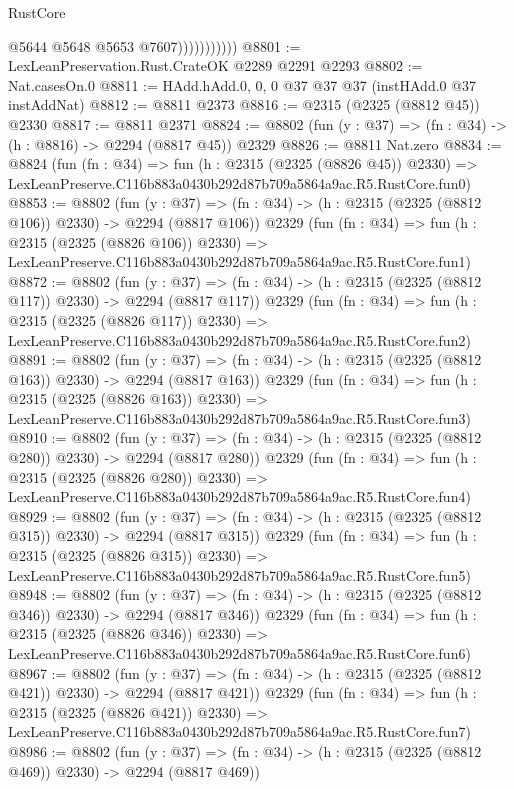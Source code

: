 \begin{lexlean}{RustCore}
\begin{coremodule}
                          @5644
                          @5648
                          @5653
                          @7607)))))))))))
@8801 := LexLeanPreservation.Rust.CrateOK @2289 @2291 @2293
@8802 := Nat.casesOn.{0}
@8811 := HAdd.hAdd.{0, 0, 0} @37 @37 @37 (instHAdd.{0} @37 instAddNat)
@8812 := @8811 @2373
@8816 := @2315 (@2325 (@8812 @45)) @2330
@8817 := @8811 @2371
@8824 := @8802 (fun (y : @37) => (fn : @34) -> (h : @8816) -> @2294 (@8817 @45)) @2329
@8826 := @8811 Nat.zero
@8834 := @8824
    (fun (fn : @34) =>
    fun (h : @2315 (@2325 (@8826 @45)) @2330) =>
    LexLeanPreserve.C116b883a0430b292d87b709a5864a9ac.R5.RustCore.fun0)
@8853 := @8802
    (fun (y : @37) => (fn : @34) -> (h : @2315 (@2325 (@8812 @106)) @2330) -> @2294 (@8817 @106))
    @2329
    (fun (fn : @34) =>
    fun (h : @2315 (@2325 (@8826 @106)) @2330) =>
    LexLeanPreserve.C116b883a0430b292d87b709a5864a9ac.R5.RustCore.fun1)
@8872 := @8802
    (fun (y : @37) => (fn : @34) -> (h : @2315 (@2325 (@8812 @117)) @2330) -> @2294 (@8817 @117))
    @2329
    (fun (fn : @34) =>
    fun (h : @2315 (@2325 (@8826 @117)) @2330) =>
    LexLeanPreserve.C116b883a0430b292d87b709a5864a9ac.R5.RustCore.fun2)
@8891 := @8802
    (fun (y : @37) => (fn : @34) -> (h : @2315 (@2325 (@8812 @163)) @2330) -> @2294 (@8817 @163))
    @2329
    (fun (fn : @34) =>
    fun (h : @2315 (@2325 (@8826 @163)) @2330) =>
    LexLeanPreserve.C116b883a0430b292d87b709a5864a9ac.R5.RustCore.fun3)
@8910 := @8802
    (fun (y : @37) => (fn : @34) -> (h : @2315 (@2325 (@8812 @280)) @2330) -> @2294 (@8817 @280))
    @2329
    (fun (fn : @34) =>
    fun (h : @2315 (@2325 (@8826 @280)) @2330) =>
    LexLeanPreserve.C116b883a0430b292d87b709a5864a9ac.R5.RustCore.fun4)
@8929 := @8802
    (fun (y : @37) => (fn : @34) -> (h : @2315 (@2325 (@8812 @315)) @2330) -> @2294 (@8817 @315))
    @2329
    (fun (fn : @34) =>
    fun (h : @2315 (@2325 (@8826 @315)) @2330) =>
    LexLeanPreserve.C116b883a0430b292d87b709a5864a9ac.R5.RustCore.fun5)
@8948 := @8802
    (fun (y : @37) => (fn : @34) -> (h : @2315 (@2325 (@8812 @346)) @2330) -> @2294 (@8817 @346))
    @2329
    (fun (fn : @34) =>
    fun (h : @2315 (@2325 (@8826 @346)) @2330) =>
    LexLeanPreserve.C116b883a0430b292d87b709a5864a9ac.R5.RustCore.fun6)
@8967 := @8802
    (fun (y : @37) => (fn : @34) -> (h : @2315 (@2325 (@8812 @421)) @2330) -> @2294 (@8817 @421))
    @2329
    (fun (fn : @34) =>
    fun (h : @2315 (@2325 (@8826 @421)) @2330) =>
    LexLeanPreserve.C116b883a0430b292d87b709a5864a9ac.R5.RustCore.fun7)
@8986 := @8802
    (fun (y : @37) => (fn : @34) -> (h : @2315 (@2325 (@8812 @469)) @2330) -> @2294 (@8817 @469))

\end{coremodule}
\end{lexlean}
